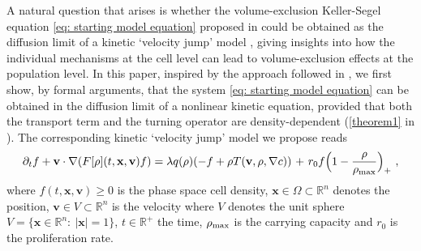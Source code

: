 \documentclass[review,onefignum,onetabnum]{siamart220329}
\begin{document}
A natural question that arises is whether the volume-exclusion Keller-Segel equation \cref{eq: starting model equation} proposed in 
 \cite{painter2002volume} could be obtained as the diffusion limit of a kinetic `velocity jump' model \cite{othmer1988models}, giving insights into how the individual mechanisms at the cell level can lead to volume-exclusion effects at the population level. In this paper, inspired by the approach followed in \cite{othmer2002diffusion,othmer2000diffusion}, we first show, by formal arguments, that the system \cref{eq: starting model equation} can be obtained in the diffusion limit of a nonlinear kinetic equation, provided that both the transport term and the turning operator are density-dependent { (\cref{theorem1} in )}. The corresponding kinetic `velocity jump' model we propose reads 
\begin{equation}
    \partial_t f+\mathbf{v}\cdot \nabla(F[\rho](t,\mathbf{x},\mathbf{v}) f)= \lambda q(\rho)(-f+\rho T(\mathbf{v},\rho,\nabla c)) {\ +\ r_0f\Bigl(1-\frac{\rho}{\rho_{\textnormal{max}}} \Bigr)_+}\ ,\label{eq: inital model without scaling}
\end{equation} where $f(t,\mathbf{x},\mathbf{v}) \geq 0$ is the phase space cell density,  $\mathbf{x}\in \Omega \subset \mathbb{R}^n$ denotes the position, $\mathbf{v} \in V \subset \mathbb{R}^n$ is the velocity where $V$ denotes the unit sphere  $V=\{\mathbf{x}\in\mathbb{R}^n:\ |\mathbf{x}|=1 \}$,  $t \in \mathbb{R}^+$ the time,  $\rho_{\textnormal{max}}$ is the carrying capacity and $r_0$ is the proliferation rate.
\end{document}

